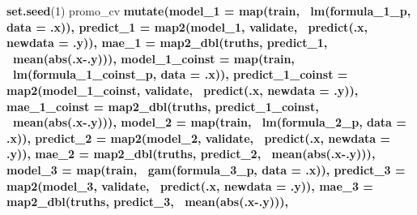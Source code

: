 \documentclass[]{article}
\newenvironment{Shaded}{\begin{snugshade}}{\end{snugshade}}
\newcommand{\DataTypeTok}[1]{\textcolor[rgb]{0.13,0.29,0.53}{#1}}
\newcommand{\DecValTok}[1]{\textcolor[rgb]{0.00,0.00,0.81}{#1}}
\newcommand{\KeywordTok}[1]{\textcolor[rgb]{0.13,0.29,0.53}{\textbf{#1}}}
\newcommand{\NormalTok}[1]{#1}
\newcommand{\OperatorTok}[1]{\textcolor[rgb]{0.81,0.36,0.00}{\textbf{#1}}}
\newcommand{\StringTok}[1]{\textcolor[rgb]{0.31,0.60,0.02}{#1}}
\begin{document}
\begin{Shaded}
\begin{Highlighting}[]
\KeywordTok{set.seed}\NormalTok{(}\DecValTok{1}\NormalTok{)}
\NormalTok{promo_cv }\OperatorTok{%>%}\StringTok{ }
\StringTok{  }\KeywordTok{mutate}\NormalTok{(}\DataTypeTok{model_1 =} \KeywordTok{map}\NormalTok{(train, }\OperatorTok{~}\KeywordTok{lm}\NormalTok{(formula_}\DecValTok{1}\NormalTok{_p, }\DataTypeTok{data =}\NormalTok{ .x)),}
         \DataTypeTok{predict_1 =} \KeywordTok{map2}\NormalTok{(model_}\DecValTok{1}\NormalTok{, validate, }\OperatorTok{~}\KeywordTok{predict}\NormalTok{(.x, }\DataTypeTok{newdata =}\NormalTok{ .y)),}
         \DataTypeTok{mae_1 =} \KeywordTok{map2_dbl}\NormalTok{(truths, predict_}\DecValTok{1}\NormalTok{, }\OperatorTok{~}\KeywordTok{mean}\NormalTok{(}\KeywordTok{abs}\NormalTok{(.x}\OperatorTok{-}\NormalTok{.y))),}
         \DataTypeTok{model_1_coinst =} \KeywordTok{map}\NormalTok{(train, }\OperatorTok{~}\KeywordTok{lm}\NormalTok{(formula_}\DecValTok{1}\NormalTok{_coinst_p, }\DataTypeTok{data =}\NormalTok{ .x)),}
         \DataTypeTok{predict_1_coinst =} \KeywordTok{map2}\NormalTok{(model_}\DecValTok{1}\NormalTok{_coinst, validate, }\OperatorTok{~}\KeywordTok{predict}\NormalTok{(.x, }\DataTypeTok{newdata =}\NormalTok{ .y)),}
         \DataTypeTok{mae_1_coinst =} \KeywordTok{map2_dbl}\NormalTok{(truths, predict_}\DecValTok{1}\NormalTok{_coinst, }\OperatorTok{~}\KeywordTok{mean}\NormalTok{(}\KeywordTok{abs}\NormalTok{(.x}\OperatorTok{-}\NormalTok{.y))),}
         \DataTypeTok{model_2 =} \KeywordTok{map}\NormalTok{(train, }\OperatorTok{~}\KeywordTok{lm}\NormalTok{(formula_}\DecValTok{2}\NormalTok{_p, }\DataTypeTok{data =}\NormalTok{ .x)),}
         \DataTypeTok{predict_2 =} \KeywordTok{map2}\NormalTok{(model_}\DecValTok{2}\NormalTok{, validate, }\OperatorTok{~}\KeywordTok{predict}\NormalTok{(.x, }\DataTypeTok{newdata =}\NormalTok{ .y)),}
         \DataTypeTok{mae_2 =} \KeywordTok{map2_dbl}\NormalTok{(truths, predict_}\DecValTok{2}\NormalTok{, }\OperatorTok{~}\KeywordTok{mean}\NormalTok{(}\KeywordTok{abs}\NormalTok{(.x}\OperatorTok{-}\NormalTok{.y))),}
         \DataTypeTok{model_3 =} \KeywordTok{map}\NormalTok{(train, }\OperatorTok{~}\KeywordTok{gam}\NormalTok{(formula_}\DecValTok{3}\NormalTok{_p, }\DataTypeTok{data =}\NormalTok{ .x)),}
         \DataTypeTok{predict_3 =} \KeywordTok{map2}\NormalTok{(model_}\DecValTok{3}\NormalTok{, validate, }\OperatorTok{~}\KeywordTok{predict}\NormalTok{(.x, }\DataTypeTok{newdata =}\NormalTok{ .y)),}
         \DataTypeTok{mae_3 =} \KeywordTok{map2_dbl}\NormalTok{(truths, predict_}\DecValTok{3}\NormalTok{, }\OperatorTok{~}\KeywordTok{mean}\NormalTok{(}\KeywordTok{abs}\NormalTok{(.x}\OperatorTok{-}\NormalTok{.y))),}
}
\end{Highlighting}
\end{Shaded}
\end{document}
